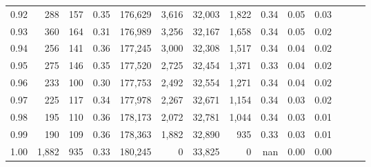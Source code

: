 \begin{tabular}{rrrrrrrrrrrrrr}
0.92 &    288 &  157 &  0.35 &  176,629 &    3,616 &  32,003 &   1,822 &  0.34 &  0.05 &      0.03 \\
0.93 &    360 &  164 &  0.31 &  176,989 &    3,256 &  32,167 &   1,658 &  0.34 &  0.05 &      0.02 \\
0.94 &    256 &  141 &  0.36 &  177,245 &    3,000 &  32,308 &   1,517 &  0.34 &  0.04 &      0.02 \\
0.95 &    275 &  146 &  0.35 &  177,520 &    2,725 &  32,454 &   1,371 &  0.33 &  0.04 &      0.02 \\
0.96 &    233 &  100 &  0.30 &  177,753 &    2,492 &  32,554 &   1,271 &  0.34 &  0.04 &      0.02 \\
0.97 &    225 &  117 &  0.34 &  177,978 &    2,267 &  32,671 &   1,154 &  0.34 &  0.03 &      0.02 \\
0.98 &    195 &  110 &  0.36 &  178,173 &    2,072 &  32,781 &   1,044 &  0.34 &  0.03 &      0.01 \\
0.99 &    190 &  109 &  0.36 &  178,363 &    1,882 &  32,890 &     935 &  0.33 &  0.03 &      0.01 \\
1.00 &  1,882 &  935 &  0.33 &  180,245 &        0 &  33,825 &       0 &   nan &  0.00 &      0.00 \\
\bottomrule
\end{tabular}

